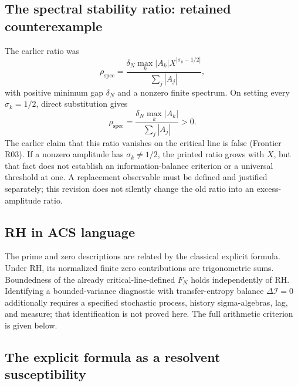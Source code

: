 \documentclass[11pt,a4paper]{article}
\theoremstyle{plain}
\theoremstyle{definition}
\theoremstyle{remark}
\newcommand{\DI}{\Delta\mathcal{I}}
\begin{document}
\subsection{The spectral stability ratio: retained counterexample}
The earlier ratio was
\begin{equation}\label{eq:rho-spec}
 \rho_{\mathrm{spec}}=
 \frac{\delta_N\max_k |A_k|X^{|\sigma_k-1/2|}}{\sum_j|A_j|},
\end{equation}
with positive minimum gap $\delta_N$ and a nonzero finite spectrum.
On setting every $\sigma_k=1/2$, direct substitution gives
\[
 \rho_{\mathrm{spec}}=\frac{\delta_N\max_k|A_k|}{\sum_j|A_j|}>0.
\]
The earlier claim that this ratio vanishes on the critical line is false
(Frontier R03). If a nonzero amplitude has $\sigma_k\ne1/2$, the printed
ratio grows with $X$, but that fact does not establish an information-balance
criterion or a universal threshold at one. A replacement observable must
be defined and justified separately; this revision does not silently change
the old ratio into an excess-amplitude ratio.

\subsection{RH in ACS language}
The prime and zero descriptions are related by the classical explicit
formula. Under RH, its normalized finite zero contributions are
trigonometric sums. Boundedness of the already critical-line-defined $F_N$
holds independently of RH. Identifying a bounded-variance diagnostic with
transfer-entropy balance $\DI=0$ additionally requires a specified stochastic
process, history sigma-algebras, lag, and measure; that identification is not
proved here. The full arithmetic criterion is given below.

\subsection{The explicit formula as a resolvent susceptibility}
\label{sec:resolvent}
\end{document}
